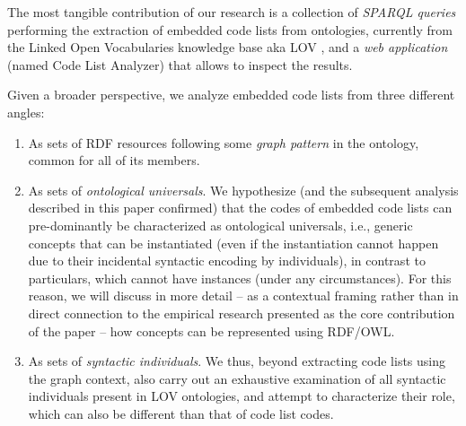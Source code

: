 

The most tangible contribution of our research is a collection of \emph{SPARQL queries} performing the extraction of embedded code lists from ontologies, currently from the Linked Open Vocabularies knowledge base aka LOV \cite{DBLP:journals/semweb/VandenbusscheAP17}, and a \emph{web application} (named Code List Analyzer) that allows to inspect the results. 


Given a broader perspective, we analyze embedded code lists from three different angles:
\begin{enumerate}
    \item As sets of RDF resources following some \emph{graph pattern} in the ontology, common for all of its members.
    \item As sets of \emph{ontological universals}. We hypothesize (and the subsequent analysis described in this paper confirmed) that the codes of embedded code lists can pre-dominantly be characterized as ontological universals, i.e., generic concepts that can be instantiated (even if the instantiation cannot happen due to their incidental syntactic encoding by individuals), in contrast to particulars, which cannot have instances (under any circumstances). For this reason, we will discuss in more detail -- as a contextual framing rather than in direct connection to the empirical research presented as the core contribution of the paper -- how concepts can be represented using RDF/OWL.
    \item As sets of \emph{syntactic individuals}. We thus, beyond extracting code lists using the graph context, also carry out an exhaustive examination of all syntactic individuals present in LOV ontologies, and attempt to characterize their role, which can also be different than that of code list codes.
\end{enumerate}

